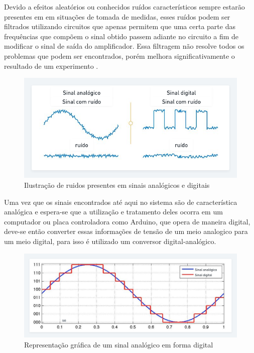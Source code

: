 Devido a efeitos aleatórios ou conhecidos ruídos característicos sempre estarão presentes em em situações de tomada de medidas, esses ruídos podem ser filtrados utilizando circuitos que apenas permitem que uma certa parte das frequências que compõem o sinal obtido passem adiante no circuito a fim de modificar o sinal de saída do amplificador. Essa filtragem não resolve todos os problemas que podem ser encontrados, porém melhora significativamente o resultado de um experimento \autocite{Hollman2011}.

\begin{figure}[htb]
	\caption{\label{fig:1110} Ilustração de ruidos presentes em sinais analógicos e digitais}
	\begin{center}
		\includegraphics[width=\textwidth]{pictures/1110.png}
	\end{center}
\end{figure}

Uma vez que os sinais encontrados até aqui no sistema são de característica analógica e espera-se que a utilização e tratamento deles ocorra em um computador ou placa controladora como Arduino, que opera de maneira digital, deve-se então converter essas informações de tensão de um meio analogico para um meio digital, para isso é utilizado um conversor digital-analógico.

\begin{figure}[htb]
	\caption{\label{fig:1120} Representação gráfica de um sinal analógico em forma digital}
	\begin{center}
		\includegraphics[width=\textwidth]{pictures/1120.png}
	\end{center}
\end{figure}


